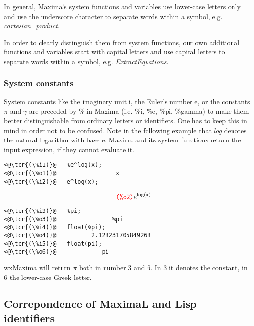 \documentclass[../Maxima_Workbook.tex]{subfiles}
\begin{document}
In general, Maxima's system functions and variables use lower-case letters only and use the underscore character to separate words within a symbol, e.g. \emph{cartesian\_product}. 

\lz In order to clearly distinguish them from system functions, our own additional functions and variables start with capital letters and use capital letters to separate words within a symbol, e.g. \emph{ExtractEquations}.

\subsubsection{System constants}\label{B1}

\lz System constants like the imaginary unit i, the Euler's number e, or the constants $ \pi $ and $ \gamma $ are preceded by \% in Maxima (i.e. \%i, \%e, \%pi, \%gamma) to make them better distinguishable from ordinary letters or identifiers. One has to keep this in mind in order not to be confused. Note in the following example that \emph{log} denotes the natural logarithm with base e. Maxima and its system functions return the input expression, if they cannot evaluate it.

\lz \begin{small}
\color{blue} \leqn
\begin{lstlisting}
<@\tcr{(\%i1)}@   %e^log(x);
<@\tcr{(\%o1)}@			        x
<@\tcr{(\%i2)}@   e^log(x);
\end{lstlisting}
\vspace{-5mm} \[ \tag*{\tcr{\ttfamily (\%o2)}} e^{\log (x)} \]
\vspace{-10mm} \begin{lstlisting}
<@\tcr{(\%i3)}@   %pi;
<@\tcr{(\%o3)}@			       %pi
<@\tcr{(\%i4)}@   float(%pi);
<@\tcr{(\%o4)}@			 2.128231705849268
<@\tcr{(\%i5)}@   float(pi);
<@\tcr{(\%o6)}@			 	pi
\end{lstlisting}
\color{black} \reqn
\end{small}

\lz wxMaxima will return $ \pi $ both in number 3 and 6. In 3 it denotes the constant, in 6 the lower-case Greek letter.

\subsection{Correpondence of MaximaL and Lisp identifiers}\label{LD2}
\end{document}
